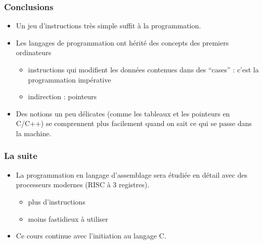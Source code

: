 \begin{frame}
\frametitle{Conclusions}
\begin{itemize}
\item 
Un jeu d'instructions très simple suffit à la programmation.
\item
Les langages de programmation ont hérité des concepts des premiers ordinateurs
\begin{itemize}
\item instructions qui modifient les données contenues dans des ``cases'' : c'est la programmation impérative
\item indirection : pointeurs
\end{itemize}
\item
Des notions un peu délicates (comme les tableaux et les pointeurs en C/C++) se comprennent
plus facilement quand on sait ce qui se passe dans la machine. 
\end{itemize}
\end{frame}

\begin{frame}
  \frametitle{La suite}
  \begin{itemize}
\item  La programmation en langage d'assemblage sera étudiée en détail avec
des processeurs modernes (RISC à 3 registres).
\begin{itemize}
\item plus d'instructions 
\item moins fastidieux à utiliser
\end{itemize}
\item
Ce cours continue avec l'initiation au langage C.
  \end{itemize}
\end{frame}

